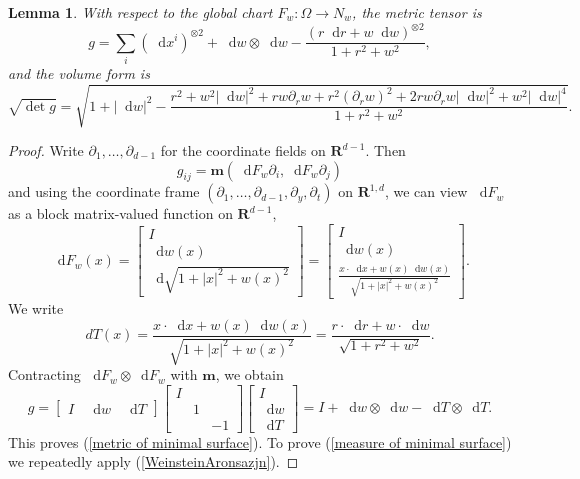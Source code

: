 \documentclass[reqno,10pt]{amsart}
\newcommand{\RR}{\mathbf{R}}
\newcommand{\Mink}{\mathbf m}
\newcommand*\dif{\mathop{}\!\mathrm{d}}
\newtheorem{lemma}[theorem]{Lemma}
\theoremstyle{definition}
\numberwithin{equation}{section}
\begin{document}
\begin{lemma}
With respect to the global chart $F_w: \Omega \to N_w$, the metric tensor is
\begin{equation}\label{metric of minimal surface}
g = \sum_i (\dif x^i)^{\otimes 2} + \dif w \otimes \dif w - \frac{(r \dif r + w \dif w)^{\otimes 2}}{1 + r^2 + w^2},
\end{equation}
and the volume form is
\begin{equation}\label{measure of minimal surface}
\sqrt{\det g} = \sqrt{1 + |\dif w|^2 - \frac{r^2 + w^2|\dif w|^2 + rw \partial_r w + r^2 (\partial_r w)^2 + 2 rw \partial_r w |\dif w|^2 + w^2 |\dif w|^4}{1 + r^2 + w^2}}.
\end{equation}
\end{lemma}
\begin{proof}
Write $\partial_1, \dots, \partial_{d - 1}$ for the coordinate fields on $\RR^{d - 1}$. Then
$$g_{ij} = \Mink(\dif F_w \partial_i, \dif F_w \partial_j)$$
and using the coordinate frame $(\partial_1, \dots, \partial_{d - 1}, \partial_y, \partial_t)$ on $\RR^{1, d}$, we can view $\dif F_w$ as a block matrix-valued function on $\RR^{d - 1}$,
$$\dif F_w(x) = \begin{bmatrix}I \\ \dif w(x) \\ \dif \sqrt{1 + |x|^2 + w(x)^2}\end{bmatrix} = \begin{bmatrix}I \\ \dif w(x) \\ \frac{x \cdot \dif x + w(x) \dif w(x)}{\sqrt{1 + |x|^2 + w(x)^2}}\end{bmatrix}.$$
We write 
$$dT(x) = \frac{x \cdot \dif x + w(x) \dif w(x)}{\sqrt{1 + |x|^2 + w(x)^2}} = \frac{r \cdot \dif r + w \cdot \dif w}{\sqrt{1 + r^2 + w^2}}.$$
Contracting $\dif F_w \otimes \dif F_w$ with $\Mink$, we obtain 
$$g = \begin{bmatrix}I & \dif w & \dif T\end{bmatrix}\begin{bmatrix}I \\ & 1 \\ && -1\end{bmatrix}\begin{bmatrix}I \\ \dif w \\ \dif T\end{bmatrix} = I + \dif w \otimes \dif w - \dif T \otimes \dif T.$$
This proves (\ref{metric of minimal surface}). To prove (\ref{measure of minimal surface}) we repeatedly apply (\ref{WeinsteinAronsazjn}).

\end{proof}
\end{document}
